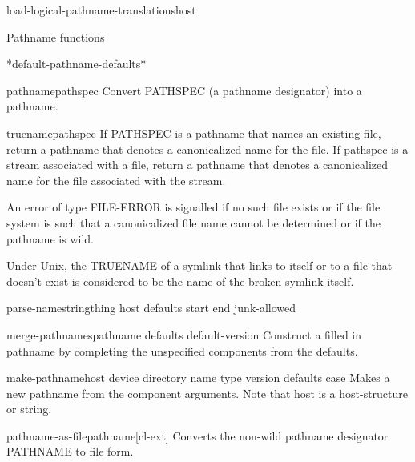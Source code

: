 \documentclass[10pt,english]{book}
\begin{document}
\begin{function}{load-logical-pathname-translations}{host}
  
\end{function}

Pathname functions

\begin{variable}{*default-pathname-defaults*}{}
  
\end{variable}

\begin{function}{pathname}{pathspec}
  Convert PATHSPEC (a pathname designator) into a pathname.
\end{function}

\begin{function}{truename}{pathspec}
  If PATHSPEC is a pathname that names an existing file, return
a pathname that denotes a canonicalized name for the file.  If
pathspec is a stream associated with a file, return a pathname
that denotes a canonicalized name for the file associated with
the stream.

An error of type FILE-ERROR is signalled if no such file exists
or if the file system is such that a canonicalized file name
cannot be determined or if the pathname is wild.

Under Unix, the TRUENAME of a symlink that links to itself or to
a file that doesn't exist is considered to be the name of the
broken symlink itself.
\end{function}

\begin{function}{parse-namestring}{thing \op host defaults \key start end junk-allowed}
  
\end{function}

\begin{function}{merge-pathnames}{pathname \op defaults default-version}
  Construct a filled in pathname by completing the unspecified components
   from the defaults.
\end{function}

\begin{function}{make-pathname}{\key host device directory name type version defaults case}
  Makes a new pathname from the component arguments. Note that host is
a host-structure or string.
\end{function}

\begin{function}{pathname-as-file}{pathname}[cl-ext]
  Converts the non-wild pathname designator PATHNAME to file form.
\end{function}
\end{document}
